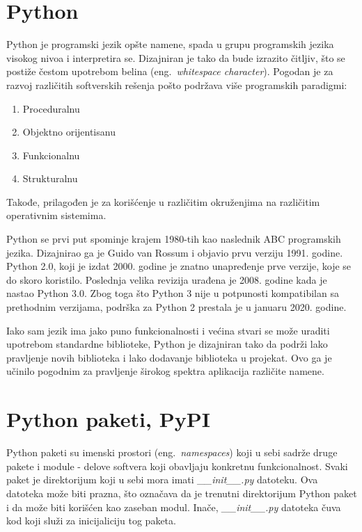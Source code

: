 \documentclass[12pt]{report}
\begin{document}
\section{Python}

Python \cite{python} je programski jezik opšte namene, spada u grupu programskih jezika visokog nivoa i interpretira se. Dizajniran je tako da bude izrazito čitljiv, što se postiže čestom upotrebom belina (eng.\ \textit{whitespace character}). Pogodan je za razvoj različitih softverskih rešenja pošto podržava više programskih paradigmi:

\begin{enumerate}
    \item Proceduralnu
    \item Objektno orijentisanu
    \item Funkcionalnu
    \item Strukturalnu
\end{enumerate}

Takođe, prilagođen je za korišćenje u različitim okruženjima na različitim operativnim sistemima.

Python se prvi put spominje krajem 1980-tih kao naslednik ABC programskih jezika. Dizajnirao ga je Guido van Rossum i objavio prvu verziju 1991. godine. Python 2.0, koji je izdat 2000. godine je znatno unapređenje prve verzije, koje se do skoro koristilo.  Poslednja velika revizija urađena je 2008. godine kada je nastao Python 3.0. Zbog toga što Python 3 nije u potpunosti kompatibilan sa prethodnim verzijama, podrška za Python 2 prestala je u januaru 2020. godine.

Iako sam jezik ima jako puno funkcionalnosti i većina stvari se može uraditi upotrebom standardne biblioteke, Python je dizajniran tako da podrži lako pravljenje novih biblioteka i lako dodavanje biblioteka u projekat. Ovo ga je učinilo pogodnim za pravljenje širokog spektra aplikacija različite namene.

\section{Python paketi, PyPI}

Python paketi su imenski prostori (eng.\ \textit{namespaces}) koji u sebi sadrže druge pakete i module - delove softvera koji obavljaju konkretnu funkcionalnost. Svaki paket je direktorijum koji u sebi mora imati \textit{\_\_init\_\_.py} datoteku. Ova datoteka može biti prazna, što označava da je trenutni direktorijum Python paket i da može biti korišćen kao zaseban modul. Inače, \textit{\_\_init\_\_.py} datoteka čuva kod koji služi za inicijaliciju tog paketa.
\end{document}

